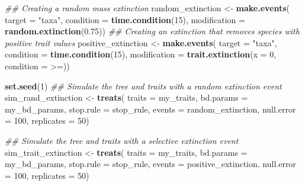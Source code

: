\documentclass[
]{article}
\newenvironment{Shaded}{\begin{snugshade}}{\end{snugshade}}
\newcommand{\CommentTok}[1]{\textcolor[rgb]{0.56,0.35,0.01}{\textit{#1}}}
\newcommand{\DataTypeTok}[1]{\textcolor[rgb]{0.13,0.29,0.53}{#1}}
\newcommand{\DecValTok}[1]{\textcolor[rgb]{0.00,0.00,0.81}{#1}}
\newcommand{\FloatTok}[1]{\textcolor[rgb]{0.00,0.00,0.81}{#1}}
\newcommand{\KeywordTok}[1]{\textcolor[rgb]{0.13,0.29,0.53}{\textbf{#1}}}
\newcommand{\NormalTok}[1]{#1}
\newcommand{\StringTok}[1]{\textcolor[rgb]{0.31,0.60,0.02}{#1}}
\begin{document}
\begin{Shaded}
\begin{Highlighting}[]
\CommentTok{\#\# Creating a random mass extinction}
\NormalTok{random\_extinction \textless{}{-}}\StringTok{ }\KeywordTok{make.events}\NormalTok{(}
    \DataTypeTok{target       =} \StringTok{"taxa"}\NormalTok{,}
    \DataTypeTok{condition    =} \KeywordTok{time.condition}\NormalTok{(}\DecValTok{15}\NormalTok{),}
    \DataTypeTok{modification =} \KeywordTok{random.extinction}\NormalTok{(}\FloatTok{0.75}\NormalTok{))}
\CommentTok{\#\# Creating an extinction that removes species with positive trait values}
\NormalTok{positive\_extinction \textless{}{-}}\StringTok{ }\KeywordTok{make.events}\NormalTok{(}
    \DataTypeTok{target =} \StringTok{"taxa"}\NormalTok{,}
    \DataTypeTok{condition =} \KeywordTok{time.condition}\NormalTok{(}\DecValTok{15}\NormalTok{),}
    \DataTypeTok{modification =} \KeywordTok{trait.extinction}\NormalTok{(}\DataTypeTok{x =} \DecValTok{0}\NormalTok{, }\DataTypeTok{condition =} \StringTok{\textasciigrave{}}\DataTypeTok{\textgreater{}=}\StringTok{\textasciigrave{}}\NormalTok{))}

\KeywordTok{set.seed}\NormalTok{(}\DecValTok{1}\NormalTok{)}
\CommentTok{\#\# Simulate the tree and traits with a random extinction event}
\NormalTok{sim\_rand\_extinction \textless{}{-}}\StringTok{ }\KeywordTok{treats}\NormalTok{(}
                   \DataTypeTok{traits     =}\NormalTok{ my\_traits,}
                   \DataTypeTok{bd.params  =}\NormalTok{ my\_bd\_params,}
                   \DataTypeTok{stop.rule  =}\NormalTok{ stop\_rule,}
                   \DataTypeTok{events     =}\NormalTok{ random\_extinction,}
                   \DataTypeTok{null.error =} \DecValTok{100}\NormalTok{,}
                   \DataTypeTok{replicates =} \DecValTok{50}\NormalTok{)}

\CommentTok{\#\# Simulate the tree and traits with a selective extinction event}
\NormalTok{sim\_trait\_extinction \textless{}{-}}\StringTok{ }\KeywordTok{treats}\NormalTok{(}
                   \DataTypeTok{traits     =}\NormalTok{ my\_traits,}
                   \DataTypeTok{bd.params  =}\NormalTok{ my\_bd\_params,}
                   \DataTypeTok{stop.rule  =}\NormalTok{ stop\_rule,}
                   \DataTypeTok{events     =}\NormalTok{ positive\_extinction,}
                   \DataTypeTok{null.error =} \DecValTok{100}\NormalTok{,}
                   \DataTypeTok{replicates =} \DecValTok{50}\NormalTok{)}
\end{Highlighting}
\end{Shaded}
\end{document}
